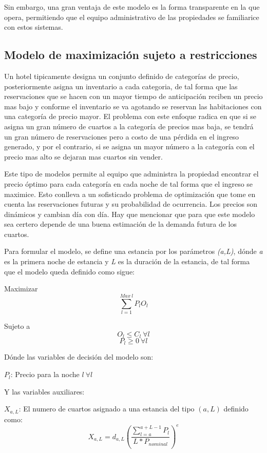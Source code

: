 {{{Sin embargo, una gran ventaja de este modelo es la forma transparente en la que opera, permitiendo que el equipo administrativo de las propiedades se familiarice con estos sistemas.

\subsection*{Modelo de maximización sujeto a restricciones}

Un hotel tipicamente designa un conjunto definido de categorías de precio, posteriormente asigna un inventario a cada categoria, de tal forma que las reservaciones que se hacen con un mayor tiempo de anticipación reciben un precio mas bajo y conforme el inventario se va agotando se reservan las habitaciones con una categoría de precio mayor. El problema con este enfoque radica en que si se asigna un gran número de cuartos a la categoría de precios mas baja, se tendrá un gran número de reservaciones pero a costo de una pérdida en el ingreso generado, y por el contrario, si se asigna un mayor número a la categoría con el precio mas alto se dejaran mas cuartos sin vender.

Este tipo de modelos permite al equipo que administra la propiedad encontrar el precio óptimo para cada categoría en cada noche de tal forma que el ingreso se maximice. Esto conlleva a un sofisticado problema de optimización que tome en cuenta las reservaciones futuras y su probabilidad de ocurrencia. Los precios son dinámicos y cambian día con día. Hay que mencionar que para que este modelo sea certero depende de una buena estimación de la demanda futura de los cuartos.

Para formular el modelo, se define una estancia por los parámetros \emph{(a,L)}, dónde \emph{a} es la primera noche de estancia y \emph{L} es la duración de la estancia, de tal forma que el modelo queda definido como sigue:

Maximizar $$\sum_{l=1}^{Max\ l} P_l O_l$$

Sujeto a $$O_l \leq C_l\  \forall l$$ $$P_l \geq 0 \ \forall l$$

Dónde las variables de decisión del modelo son:

$P_l$: Precio para la noche $l\ \forall l$

Y las variables auxiliares:

$X_{a,L}$: El numero de cuartos asignado a una estancia del tipo $(a,L)$ definido como: $$X_{a,L} = d_{a,L}(\frac{\sum_{l=a}^{a+L-1} P_l}{L*P_{nominal}})^e$$

}}}
